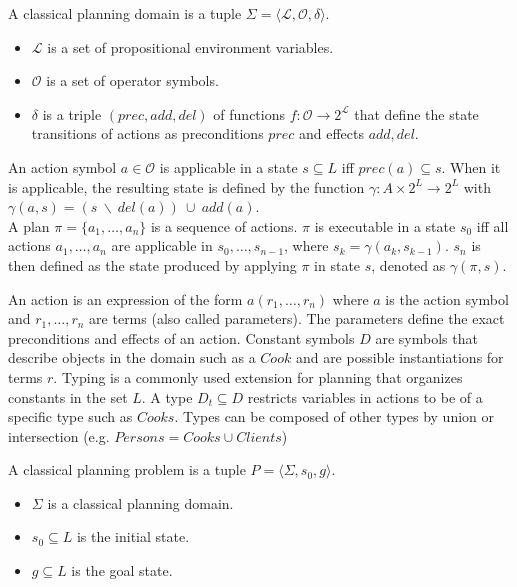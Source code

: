 \begin{definition}
  A classical planning domain is a tuple $\Sigma=\langle \mathcal{L}, \mathcal{O}, \delta \rangle$.
  \begin{itemize}
    \item $\mathcal{L}$ is a set of propositional environment variables. 
    \item $\mathcal{O}$ is a set of operator symbols.
    \item $\delta$ is a triple $(prec, add, del )$ of functions $f: \mathcal{O} \rightarrow 2^\mathcal{L}$ that define the state transitions of actions as preconditions $prec$ and effects $add, del$.
  \end{itemize}
  An action symbol $a \in \mathcal{O}$ is applicable in a state $s \subseteq L$ iff $prec(a) \subseteq s$.
  When it is applicable, the resulting state is defined by the function $\gamma: A \times 2^L \rightarrow 2^L$ with $\gamma(a,s) = (s~\backslash~del(a))~\cup~add(a)$. \\
  A plan $\pi = \{a_1,\dots,a_n\}$ is a sequence of actions.
  $\pi$ is executable in a state $s_0$ iff all actions $a_1,\dots,a_n$ are applicable in $s_0,\dots,s_{n-1}$, where $s_k=\gamma(a_k,s_{k-1})$.
  $s_n$ is then defined as the state produced by applying $\pi$ in state $s$, denoted as $\gamma(\pi,s)$.
\end{definition}

An action is an expression of the form $a(r_1,\dots,r_n)$ where $a$ is the action symbol and $r_1,\dots,r_n$ are terms (also called parameters).
The parameters define the exact preconditions and effects of an action.
Constant symbols $D$ are symbols that describe objects in the domain such as a $Cook$ and are possible instantiations for terms $r$.
Typing is a commonly used extension for planning that organizes constants in the set $L$.
A type $D_t \subseteq D$ restricts variables in actions to be of a specific type such as $Cooks$.
Types can be composed of other types by union or intersection (e.g. $Persons=Cooks\cup Clients$)

\begin{definition}
  A classical planning problem is a tuple $P=\langle \Sigma, s_0, g \rangle$.
  \begin{itemize}
    \item $\Sigma$ is a classical planning domain.
    \item $s_0 \subseteq L$ is the initial state.
    \item $g \subseteq L$ is the goal state.
  \end{itemize}
\end{definition}

